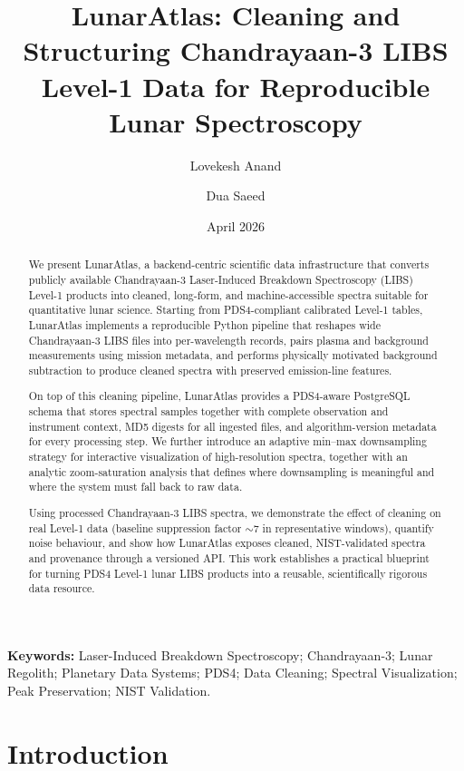 \documentclass[12pt,a4paper]{article}
\title{LunarAtlas: Cleaning and Structuring Chandrayaan-3 LIBS Level-1 Data for Reproducible Lunar Spectroscopy}
\author[1]{Lovekesh Anand}
\author[1]{Dua Saeed}
\affil[1]{Independent Researchers, India}
\date{April 2026}
\begin{document}
\maketitle

\begin{abstract}
We present LunarAtlas, a backend-centric scientific data infrastructure that converts publicly available Chandrayaan-3 Laser-Induced Breakdown Spectroscopy (LIBS) Level-1 products into cleaned, long-form, and machine-accessible spectra suitable for quantitative lunar science. Starting from PDS4-compliant calibrated Level-1 tables, LunarAtlas implements a reproducible Python pipeline that reshapes wide Chandrayaan-3 LIBS files into per-wavelength records, pairs plasma and background measurements using mission metadata, and performs physically motivated background subtraction to produce cleaned spectra with preserved emission-line features.

On top of this cleaning pipeline, LunarAtlas provides a PDS4-aware PostgreSQL schema that stores spectral samples together with complete observation and instrument context, MD5 digests for all ingested files, and algorithm-version metadata for every processing step. We further introduce an adaptive min--max downsampling strategy for interactive visualization of high-resolution spectra, together with an analytic zoom-saturation analysis that defines where downsampling is meaningful and where the system must fall back to raw data.

Using processed Chandrayaan-3 LIBS spectra, we demonstrate the effect of cleaning on real Level-1 data (baseline suppression factor \(\sim 7\) in representative windows), quantify noise behaviour, and show how LunarAtlas exposes cleaned, NIST-validated spectra and provenance through a versioned API. This work establishes a practical blueprint for turning PDS4 Level-1 lunar LIBS products into a reusable, scientifically rigorous data resource.
\end{abstract}

\noindent\textbf{Keywords:} Laser-Induced Breakdown Spectroscopy; Chandrayaan-3; Lunar Regolith; Planetary Data Systems; PDS4; Data Cleaning; Spectral Visualization; Peak Preservation; NIST Validation.

\section{Introduction}
\label{sec:intro}
\end{document}

